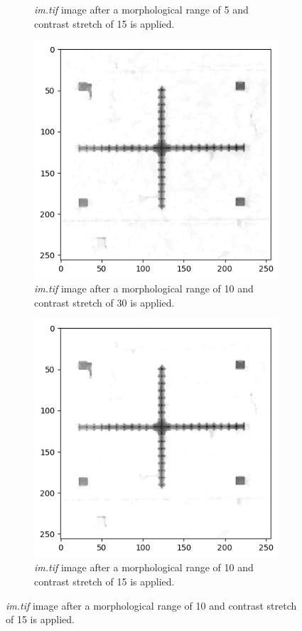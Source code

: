 \documentclass{article}
\begin{document}
\begin{figure}[htb]
\begin{subfigure}{0.4\textwidth}
  \caption{\emph{im.tif } image after a morphological range of 5 and contrast stretch of 15 is applied.}
  \label{fig:im_tif_contrast_15}
\end{subfigure}\hfil 
\begin{subfigure}{0.4\textwidth}
  \includegraphics[width=\linewidth]{Report/Appendix_Images/im_tif_csr_10.png}
  \caption{\emph{im.tif } image after a morphological range of 10 and contrast stretch of 30 is applied.}
  \label{fig:im_tif_contrast_30}
\end{subfigure}
\medskip
\begin{subfigure}{0.4\textwidth}
  \includegraphics[width=\linewidth]{Report/Appendix_Images/im_tif_csr_10_15.png}
  \caption{\emph{im.tif} image after a morphological range of 10 and contrast stretch of 15 is applied.}
  \label{fig:4}
\end{subfigure}\hfil 


\end{figure}
\end{document}
